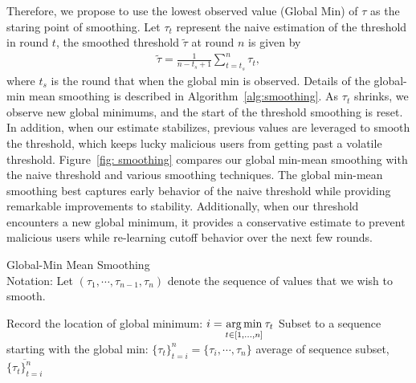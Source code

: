\documentclass{article} %
\begin{document}
Therefore, we propose to use the lowest observed value (Global Min) of $\tau$ as the staring point of smoothing. Let $\tau_t$ represent the naive estimation of the threshold in round $t$, the smoothed threshold $\tilde{\tau}$ at round $n$ is given by
\begin{align*}
    \tilde{\tau} = \frac{1}{n-t_s+1}\sum_{t=t_s}^n \tau_t,
\end{align*}
where $t_s$ is the round that when the global min is observed. Details of the global-min mean smoothing is described in Algorithm~\ref{alg:smoothing}. As $\tau_t$ shrinks, we observe new global minimums, and the start of the threshold smoothing is reset. 
In addition, when our estimate stabilizes, previous values are leveraged to smooth the threshold, which keeps lucky malicious users from getting past a volatile threshold. Figure~\ref{fig: smoothing} compares our global min-mean smoothing with the naive threshold and various smoothing techniques.
The global min-mean smoothing best captures early behavior of the naive threshold while providing remarkable improvements to stability. Additionally, when our threshold encounters a new global minimum, it provides a conservative estimate to prevent malicious users while re-learning cutoff behavior over the next few rounds.

\vspace{-10pt}
\begin{algorithm}[H]
\caption{Global-Min Mean Smoothing \\ 
Notation: Let $(\tau_1, \cdots, \tau_{n - 1}, \tau_n)$ denote the sequence of values that we wish to smooth.
}
\label{alg:smoothing}
\begin{algorithmic}[1]
        \State Record the location of global minimum: $i = \operatorname*{arg\,min}\limits_{t \in [1,...,n] } \tau_t$
        \State Subset to a sequence starting with the global min: $\{\tau_t\}_{t=i}^n = \{\tau_i, \cdots, \tau_n \}$
        \State \Return average of sequence subset, $\overline{\{\tau_t\}_{t=i}^n}$
    \EndProcedure
\end{algorithmic}
\end{algorithm}
\vspace{-10pt}
\end{document}
